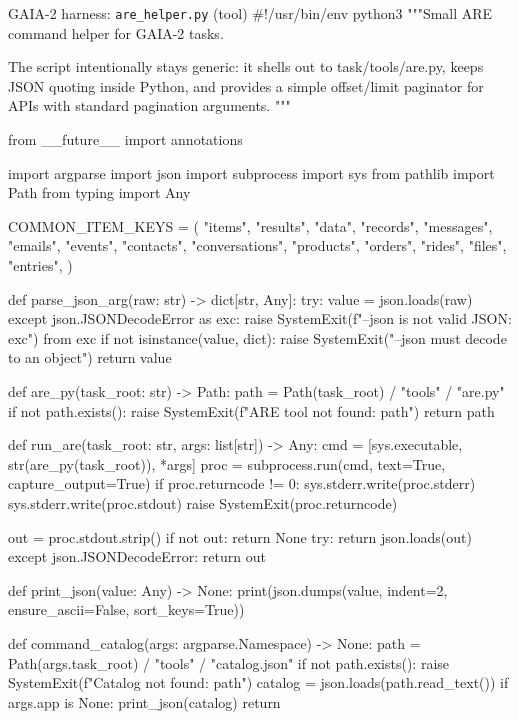 \begin{promptbox}{GAIA-2 harness: \texttt{are\_helper.py} (tool)}
#!/usr/bin/env python3
"""Small ARE command helper for GAIA-2 tasks.

The script intentionally stays generic: it shells out to task/tools/are.py,
keeps JSON quoting inside Python, and provides a simple offset/limit paginator
for APIs with standard pagination arguments.
"""

from __future__ import annotations

import argparse
import json
import subprocess
import sys
from pathlib import Path
from typing import Any


COMMON_ITEM_KEYS = (
    "items",
    "results",
    "data",
    "records",
    "messages",
    "emails",
    "events",
    "contacts",
    "conversations",
    "products",
    "orders",
    "rides",
    "files",
    "entries",
)


def parse_json_arg(raw: str) -> dict[str, Any]:
    try:
        value = json.loads(raw)
    except json.JSONDecodeError as exc:
        raise SystemExit(f"--json is not valid JSON: {exc}") from exc
    if not isinstance(value, dict):
        raise SystemExit("--json must decode to an object")
    return value


def are_py(task_root: str) -> Path:
    path = Path(task_root) / "tools" / "are.py"
    if not path.exists():
        raise SystemExit(f"ARE tool not found: {path}")
    return path


def run_are(task_root: str, args: list[str]) -> Any:
    cmd = [sys.executable, str(are_py(task_root)), *args]
    proc = subprocess.run(cmd, text=True, capture_output=True)
    if proc.returncode != 0:
        sys.stderr.write(proc.stderr)
        sys.stderr.write(proc.stdout)
        raise SystemExit(proc.returncode)

    out = proc.stdout.strip()
    if not out:
        return None
    try:
        return json.loads(out)
    except json.JSONDecodeError:
        return out


def print_json(value: Any) -> None:
    print(json.dumps(value, indent=2, ensure_ascii=False, sort_keys=True))


def command_catalog(args: argparse.Namespace) -> None:
    path = Path(args.task_root) / "tools" / "catalog.json"
    if not path.exists():
        raise SystemExit(f"Catalog not found: {path}")
    catalog = json.loads(path.read_text())
    if args.app is None:
        print_json(catalog)
        return


\end{promptbox}

